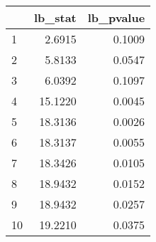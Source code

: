 \begin{tabular}{lrr}
\toprule
{} &  lb\_stat &  lb\_pvalue \\
\midrule
1  &   2.6915 &     0.1009 \\
2  &   5.8133 &     0.0547 \\
3  &   6.0392 &     0.1097 \\
4  &  15.1220 &     0.0045 \\
5  &  18.3136 &     0.0026 \\
6  &  18.3137 &     0.0055 \\
7  &  18.3426 &     0.0105 \\
8  &  18.9432 &     0.0152 \\
9  &  18.9432 &     0.0257 \\
10 &  19.2210 &     0.0375 \\
\bottomrule
\end{tabular}
